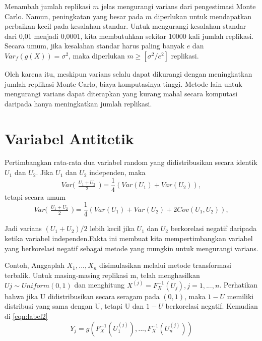 \documentclass[a4paper,12pt]{article}
\theoremstyle{definition}
\begin{document}
Menambah jumlah replikasi $m$ jelas mengurangi varians dari pengestimasi Monte Carlo. Namun, peningkatan yang besar pada $m$ diperlukan untuk mendapatkan perbaikan kecil pada kesalahan standar. Untuk mengurangi kesalahan standar dari 0,01 menjadi 0,0001, kita membutuhkan sekitar 10000 kali jumlah replikasi. Secara umum, jika kesalahan standar harus paling banyak $e$ dan $Var_f(g(X))=\sigma ^2$, maka diperlukan $m\geq[\sigma^2/e^2]$ replikasi.

Oleh karena itu, meskipun varians selalu dapat dikurangi dengan meningkatkan jumlah replikasi Monte Carlo, biaya komputasinya tinggi. Metode lain untuk mengurangi varians dapat diterapkan yang kurang mahal secara komputasi daripada hanya meningkatkan jumlah replikasi.
\section{Variabel Antitetik}
Pertimbangkan rata-rata dua variabel random yang didistribusikan secara identik $U_{1}$ dan $U_{2}$. Jika $U_{1}$ dan $U_{2}$ independen, maka
\begin{equation}
    Var\bigl(\begin{smallmatrix}
\frac{U_{1}+U_{2}}{2}
\end{smallmatrix}\bigr)= \frac{1}{4}(Var(U_{1})+Var(U_{2})),
\end{equation}
tetapi secara umum
\begin{equation}
    Var\bigl(\begin{smallmatrix}
\frac{U_{1}+U_{2}}{2}
\end{smallmatrix}\bigr)= \frac{1}{4}(Var(U_{1})+Var(U_{2})+2Cov(U_{1},U_{2})),
\end{equation}

Jadi varians $(U_{1}+U_{2})/2$ lebih kecil jika $U_{1}$ dan $U_{2}$ berkorelasi negatif daripada ketika variabel independen.Fakta ini membuat kita mempertimbangkan variabel yang berkorelasi negatif sebagai metode yang mungkin untuk mengurangi varians.

Contoh, Anggaplah $X_{1},...,X_{n}$ disimulasikan melalui metode transformasi terbalik. Untuk masing-masing replikasi m, telah menghasilkan $Uj\sim Uniform(0,1)$ dan menghitung $X^{(j)}= F_{X}^{-1}(U_{j}), j= 1,...,n$. Perhatikan bahwa jika U didistribusikan secara seragam pada $(0,1)$, maka $1-U$ memiliki distribusi yang sama dengan U, tetapi U dan $1-U$ berkorelasi negatif. Kemudian di \eqref{eqn:label2}
\begin{equation}
    Y_{j}= g(F_{X}^{-1}(U_{1}^{(j)}),...,F_{X}^{-1}(U_{n}^{(j)}))
\end{equation}
\end{document}
